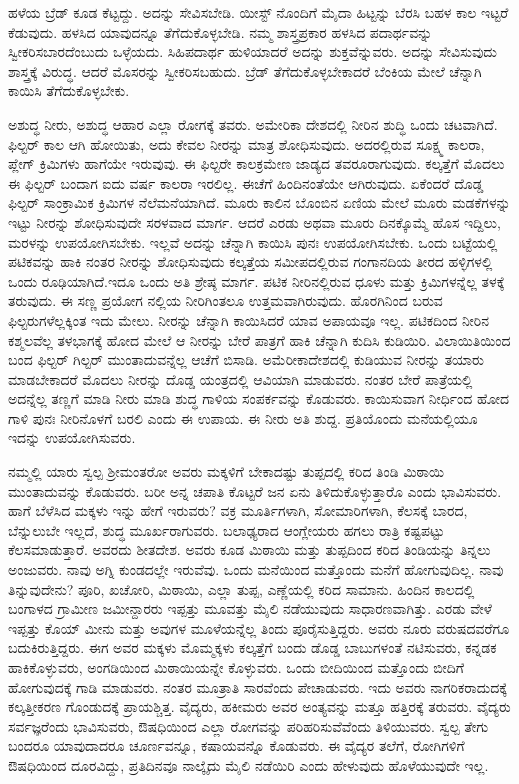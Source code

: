 ಹಳೆಯ ಬ್ರೆಡ್​ ಕೂಡ ಕೆಟ್ಟದ್ದು. ಅದನ್ನು ಸೇವಿಸಬೇಡಿ. ಯೀಸ್ಟ್​ ನೊಂದಿಗೆ ಮೈದಾ ಹಿಟ್ಟನ್ನು ಬೆರಸಿ ಬಹಳ ಕಾಲ ಇಟ್ಟರೆ ಕೆಡುವುದು. ಹಳಸಿದ ಯಾವುದನ್ನೂ ತೆಗೆದುಕೊಳ್ಳಬೇಡಿ. ನಮ್ಮ ಶಾಸ್ತ್ರಪ್ರಕಾರ ಹಳಸಿದ ಪದಾರ್ಥವನ್ನು ಸ್ವೀಕರಿಸಬಾರದೆಂಬುದು ಒಳ್ಳೆಯದು. ಸಿಹಿಪದಾರ್ಥ ಹುಳಿಯಾದರೆ ಅದನ್ನು ಶುಕ್ತವೆನ್ನುವರು. ಅದನ್ನು ಸೇವಿಸುವುದು ಶಾಸ್ತ್ರಕ್ಕೆ ವಿರುದ್ಧ. ಆದರೆ ಮೊಸರನ್ನು ಸ್ವೀಕರಿಸಬಹುದು. ಬ್ರೆಡ್​ ತೆಗೆದುಕೊಳ್ಳಬೇಕಾದರೆ ಬೆಂಕಿಯ ಮೇಲೆ ಚೆನ್ನಾಗಿ ಕಾಯಿಸಿ ತೆಗೆದುಕೊಳ್ಳಬೇಕು.

ಅಶುದ್ಧ ನೀರು, ಅಶುದ್ಧ ಆಹಾರ ಎಲ್ಲಾ ರೋಗಕ್ಕೆ ತವರು. ಅಮೇರಿಕಾ ದೇಶದಲ್ಲಿ ನೀರಿನ ಶುದ್ಧಿ ಒಂದು ಚಟವಾಗಿದೆ. ಫಿಲ್ಟರ್​ ಕಾಲ ಆಗಿ ಹೋಯಿತು, ಅದು ಕೇವಲ ನೀರನ್ನು ಮಾತ್ರ ಶೋಧಿಸುವುದು. ಅದರಲ್ಲಿರುವ ಸೂಕ್ಷ್ಮ ಕಾಲರಾ, ಪ್ಲೇಗ್​ ಕ್ರಿಮಿಗಳು ಹಾಗೆಯೇ ಇರುವುವು. ಈ ಫಿಲ್ಟರೇ ಕಾಲಕ್ರಮೇಣ ಜಾಡ್ಯದ ತವರೂರಾಗುವುದು. ಕಲ್ಕತ್ತೆಗೆ ಮೊದಲು ಈ ಫಿಲ್ಟರ್​ ಬಂದಾಗ ಐದು ವರ್ಷ ಕಾಲರಾ ಇರಲಿಲ್ಲ. ಈಚೆಗೆ ಹಿಂದಿನಂತೆಯೇ ಆಗಿರುವುದು. ಏಕೆಂದರೆ ದೊಡ್ಡ ಫಿಲ್ಟರ್​ ಸಾಂಕ್ರಾಮಿಕ ಕ್ರಿಮಿಗಳ ನೆಲೆಮನೆಯಾಗಿದೆ. ಮೂರು ಕಾಲಿನ ಬೊಂಬಿನ ಏಣಿಯ ಮೇಲೆ ಮೂರು ಮಡಕೆಗಳನ್ನು ಇಟ್ಟು ನೀರನ್ನು ಶೋಧಿಸುವುದೇ ಸರಳವಾದ ಮಾರ್ಗ. ಆದರೆ ಎರಡು ಅಥವಾ ಮೂರು ದಿನಕ್ಕೊಮ್ಮೆ ಹೊಸ ಇದ್ದಿಲು, ಮರಳನ್ನು ಉಪಯೋಗಿಸಬೇಕು. ಇಲ್ಲವೆ ಅದನ್ನು ಚೆನ್ನಾಗಿ ಕಾಯಿಸಿ ಪುನಃ ಉಪಯೋಗಿಸಬೇಕು. ಒಂದು ಬಟ್ಟೆಯಲ್ಲಿ ಪಟಿಕವನ್ನು ಹಾಕಿ ನಂತರ ನೀರನ್ನು ಶೋಧಿಸುವುದು ಕಲ್ಕತ್ತೆಯ ಸಮೀಪದಲ್ಲಿರುವ ಗಂಗಾನದಿಯ ತೀರದ ಹಳ್ಳಿಗಳಲ್ಲಿ ಒಂದು ರೂಢಿಯಾಗಿದೆ.ಇದೂ ಒಂದು ಅತಿ ಶ್ರೇಷ್ಠ ಮಾರ್ಗ. ಪಟಿಕ ನೀರಿನಲ್ಲಿರುವ ಧೂಳು ಮತ್ತು ಕ್ರಿಮಿಗಳನ್ನೆಲ್ಲ ತಳಕ್ಕೆ ತರುವುದು. ಈ ಸಣ್ಣ ಪ್ರಯೋಗ ನಲ್ಲಿಯ ನೀರಿಗಿಂತಲೂ ಉತ್ತಮವಾಗಿರುವುದು. ಹೊರಗಿನಿಂದ ಬರುವ ಫಿಲ್ಟರುಗಳೆಲ್ಲಕ್ಕಿಂತ ಇದು ಮೇಲು. ನೀರನ್ನು ಚೆನ್ನಾಗಿ ಕಾಯಿಸಿದರೆ ಯಾವ ಅಪಾಯವೂ ಇಲ್ಲ. ಪಟಿಕದಿಂದ ನೀರಿನ ಕಶ್ಮಲವೆಲ್ಲ ತಳಭಾಗಕ್ಕೆ ಹೋದ ಮೇಲೆ ಆ ನೀರನ್ನು ಬೇರೆ ಪಾತ್ರಗೆ ಹಾಕಿ ಚೆನ್ನಾಗಿ ಕುದಿಸಿ ಕುಡಿಯಿರಿ. ವಿಲಾಯಿತಿಯಿಂದ ಬಂದ ಫಿಲ್ಟರ್​ ಗಿಲ್ಟರ್​ ಮುಂತಾದುವನ್ನೆಲ್ಲ ಆಚೆಗೆ ಬಿಸಾಡಿ. ಅಮೆರೀಕಾದೇಶದಲ್ಲಿ ಕುಡಿಯುವ ನೀರನ್ನು ತಯಾರು ಮಾಡಬೇಕಾದರೆ ಮೊದಲು ನೀರನ್ನು ದೊಡ್ಡ ಯಂತ್ರದಲ್ಲಿ ಆವಿಯಾಗಿ ಮಾಡುವರು. ನಂತರ ಬೇರೆ ಪಾತ್ರೆಯಲ್ಲಿ ಅದನ್ನೆಲ್ಲ ತಣ್ಣಗೆ ಮಾಡಿ ನೀರು ಮಾಡಿ ಶುದ್ಧ ಗಾಳಿಯ ಸಂಪರ್ಕವನ್ನು ಕೊಡುವರು. ಕಾಯಿಸುವಾಗ ನೀರ್ಧಿಂದ ಹೋದ ಗಾಳಿ ಪುನಃ ನೀರಿನೊಳಗೆ ಬರಲಿ ಎಂದು ಈ ಉಪಾಯ. ಈ ನೀರು ಅತಿ ಶುದ್ದ. ಪ್ರತಿಯೊಂದು ಮನೆಯಲ್ಲಿಯೂ ಇದನ್ನು ಉಪಯೋಗಿಸುವರು.

ನಮ್ಮಲ್ಲಿ ಯಾರು ಸ್ವಲ್ಪ ಶ‍್ರೀಮಂತರೋ ಅವರು ಮಕ್ಕಳಿಗೆ ಬೇಕಾದಷ್ಟು ತುಪ್ಪದಲ್ಲಿ ಕರಿದ ತಿಂಡಿ ಮಿಠಾಯಿ ಮುಂತಾದುವನ್ನು ಕೊಡುವರು. ಬರೀ ಅನ್ನ ಚಪಾತಿ ಕೊಟ್ಟರೆ ಜನ ಏನು ತಿಳಿದುಕೊಳ್ಳುತ್ತಾರೊ ಎಂದು ಭಾವಿಸುವರು. ಹಾಗೆ ಬೆಳೆಸಿದ ಮಕ್ಕಳು ಇನ್ನು ಹೇಗೆ ಇರುವರು? ವಕ್ರ ಮೂರ್ತಿಗಳಾಗಿ, ಸೋಮಾರಿಗಳಾಗಿ, ಕೆಲಸಕ್ಕೆ ಬಾರದ, ಬೆನ್ನುಲುಬೇ ಇಲ್ಲದೆ, ಶುದ್ಧ ಮೂರ್ಖರಾಗುವರು. ಬಲಾಢ್ಯರಾದ ಆಂಗ್ಲೇಯರು ಹಗಲು ರಾತ್ರಿ ಕಷ್ಟಪಟ್ಟು ಕೆಲಸಮಾಡುತ್ತಾರೆ. ಅವರದು ಶೀತದೇಶ. ಅವರು ಕೂಡ ಮಿಠಾಯಿ ಮತ್ತು ತುಪ್ಪದಿಂದ ಕರಿದ ತಿಂಡಿಯನ್ನು ತಿನ್ನಲು ಅಂಜುವರು. ನಾವು ಅಗ್ನಿ ಕುಂಡದಲ್ಲೇ ಇರುವೆವು. ಒಂದು ಮನೆಯಿಂದ ಮತ್ತೊಂದು ಮನೆಗೆ ಹೋಗುವುದಿಲ್ಲ. ನಾವು ತಿನ್ನುವುದೇನು? ಪೂರಿ, ಖಚೋರಿ, ಮಿಠಾಯಿ, ಎಲ್ಲಾ ತುಪ್ಪ, ಎಣ್ಣೆಯಲ್ಲಿ ಕರಿದ ಸಾಮಾನು. ಹಿಂದಿನ ಕಾಲದಲ್ಲಿ ಬಂಗಾಳದ ಗ್ರಾಮೀಣ ಜಮೀನ್ದಾರರು ಇಪ್ಪತ್ತು ಮೂವತ್ತು ಮೈಲಿ ನಡೆಯುವುದು ಸಾಧಾರಣವಾಗಿತ್ತು. ಎರಡು ವೇಳೆ ಇಪ್ಪತ್ತು ಕೊಯ್​ ಮೀನು ಮತ್ತು ಅವುಗಳ ಮೂಳೆ\break ಯನ್ನೆಲ್ಲ ತಿಂದು ಪೂರೈಸುತ್ತಿದ್ದರು. ಅವರು ನೂರು ವರುಷದವರೆಗೂ ಬದುಕಿರುತ್ತಿದ್ದರು. ಈಗ ಅವರ ಮಕ್ಕಳು ಮೊಮ್ಮಕ್ಕಳು ಕಲ್ಕತ್ತೆಗೆ ಬಂದು ಡೊಡ್ಡ ಬಾಬುಗಳಂತೆ ನಟಿಸುವರು, ಕನ್ನಡಕ ಹಾಕಿಕೊಳ್ಳುವರು, ಅಂಗಡಿಯಿಂದ ಮಿಠಾಯಿಯನ್ನೇ ಕೊಳ್ಳುವರು. ಒಂದು ಬೀದಿಯಿಂದ ಮತ್ತೊಂದು ಬೀದಿಗೆ ಹೋಗುವುದಕ್ಕೆ ಗಾಡಿ ಮಾಡುವರು. ನಂತರ ಮೂತ್ರಾತಿ ಸಾರವೆಂದು ಪೇಚಾಡುವರು. ಇದು ಅವರು ನಾಗರಿಕರಾದುದಕ್ಕೆ ಕಲ್ಕತ್ತೀಕರಣ ಗೊಂಡುದಕ್ಕೆ ಪ್ರಾಯಶ್ಚಿತ್ತ. ವೈದ್ಯರು, ಹಕೀಮರು ಅವರ ಅಂತ್ಯವನ್ನು ಮತ್ತೂ ಹತ್ತಿರಕ್ಕೆ ತರುವರು. ವೈದ್ಯರು ಸರ್ವಜ್ಞರೆಂದು ಭಾವಿಸುವರು, ಔಷಧಿಯಿಂದ ಎಲ್ಲಾ ರೋಗವನ್ನು ಪರಿಹರಿಸುವೆ\break ವೆಂದು ತಿಳಿಯುವರು. ಸ್ವಲ್ಪ ತೇಗು ಬಂದರೂ ಯಾವುದಾದರೂ ಚೂರ್ಣವನ್ನೂ, ಕಷಾಯವನ್ನೊ ಕೊಡುವರು. ಈ ವೈದ್ಯರ ತಲೆಗೆ, ರೋಗಿಗಳಿಗೆ ಔಷಧಿಯಿಂದ ದೂರವಿದ್ದು, ಪ್ರತಿದಿನವೂ ನಾಲ್ಕೈದು ಮೈಲಿ ನಡೆಯಿರಿ ಎಂದು ಹೇಳುವುದು ಹೊಳೆಯುವುದೇ ಇಲ್ಲ.

